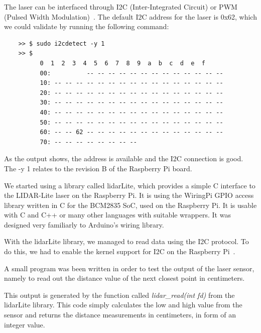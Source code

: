 The laser can be interfaced through I2C (Inter-Integrated Circuit) or PWM (Pulsed Width Modulation)~\cite{lidarsum}. The default I2C address for the laser is 0x62, which we could validate by running the following command:
\lstset{language=sh}
\begin{lstlisting}
	>> $ sudo i2cdetect -y 1
	>> $
		  0  1  2  3  4  5  6  7  8  9  a  b  c  d  e  f
		  00:          -- -- -- -- -- -- -- -- -- -- -- -- --
		  10: -- -- -- -- -- -- -- -- -- -- -- -- -- -- -- --
		  20: -- -- -- -- -- -- -- -- -- -- -- -- -- -- -- --
		  30: -- -- -- -- -- -- -- -- -- -- -- -- -- -- -- --
		  40: -- -- -- -- -- -- -- -- -- -- -- -- -- -- -- --
		  50: -- -- -- -- -- -- -- -- -- -- -- -- -- -- -- --
		  60: -- -- 62 -- -- -- -- -- -- -- -- -- -- -- -- --
		  70: -- -- -- -- -- -- -- -- 
\end{lstlisting}

As the output shows, the address is available and the I2C connection is good. The -y 1 relates to the revision B of the Raspberry Pi board.

We started using a library called lidarLite, which provides a simple C interface to the LIDAR-Lite laser on the Raspberry Pi. It is using the WiringPi GPIO access library written in C for the BCM2835 SoC, used on the Raspberry Pi. It is usable with C and C++ or many other languages with suitable wrappers. It was designed very familiarly to Arduino's wiring library.

With the lidarLite library\cite{lidarlib}, we managed to read data using the I2C protocol. To do this, we had to enable the kernel support for I2C on the Raspberry Pi~\cite{i2csetup}.

A small program was been written in order to test the output of the laser sensor, namely to read out the distance value of the next closest point in centimeters. 



This output is generated by the function called \textit{lidar\_read(int fd)} from the lidarLite library. This code simply calculates the low and high value from the sensor and returns the distance measurements in centimeters, in form of an integer value.




